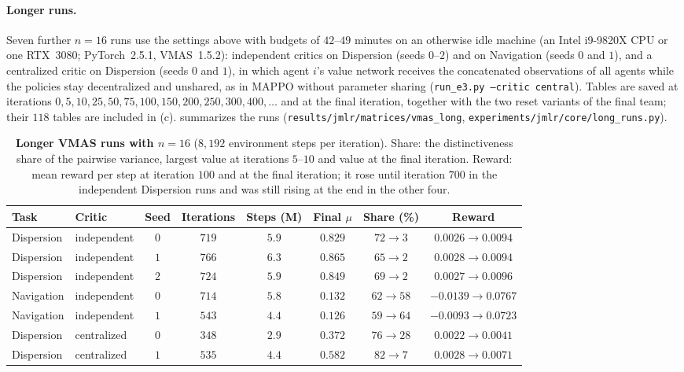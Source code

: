 \paragraph{Longer runs.}
\label{app:exp-details:long}
Seven further $n=16$ runs use the settings above with budgets of $42$--$49$
minutes on an otherwise idle machine (an Intel i9-9820X CPU or one RTX~3080;
PyTorch~2.5.1, VMAS~1.5.2): independent critics on Dispersion (seeds $0$--$2$) and
on Navigation (seeds $0$ and $1$), and a centralized critic on Dispersion (seeds
$0$ and $1$), in which agent $i$'s value network receives the concatenated
observations of all agents while the policies stay decentralized and unshared,
as in MAPPO \citep{yu2022surprising} without parameter sharing
(\texttt{run\_e3.py --critic central}). Tables are saved at iterations
$0,5,10,25,50,75,100,150,200,250,300,400,\dots$ and at the final iteration,
together with the two reset variants of the final team; their $118$ tables are
included in (c).  summarizes the runs
(\texttt{results/jmlr/matrices/vmas\_long}, \texttt{experiments/jmlr/core/long\_runs.py}).

\begin{table}[ht]
\centering
\small
\caption{\textbf{Longer VMAS runs with $n=16$} ($8{,}192$ environment steps per iteration).
Share: the distinctiveness share of the pairwise variance, largest value at
iterations $5$--$10$ and value at the final iteration. Reward: mean reward per
step at iteration $100$ and at the final iteration; it rose until iteration
$700$ in the independent Dispersion runs and was still rising at the end in the
other four.}
\label{tab:long-runs}
\setlength{\tabcolsep}{4.5pt}
\begin{tabular}{@{}llcccccc@{}}
\toprule
Task & Critic & Seed & Iterations & Steps (M) & Final $\mu$ & Share (\%) & Reward \\
\midrule
Dispersion & independent & $0$ & $719$ & $5.9$ & $0.829$ & $72\to3$ & $0.0026\to0.0094$ \\
Dispersion & independent & $1$ & $766$ & $6.3$ & $0.865$ & $65\to2$ & $0.0028\to0.0094$ \\
Dispersion & independent & $2$ & $724$ & $5.9$ & $0.849$ & $69\to2$ & $0.0027\to0.0096$ \\
Navigation & independent & $0$ & $714$ & $5.8$ & $0.132$ & $62\to58$ & $-0.0139\to0.0767$ \\
Navigation & independent & $1$ & $543$ & $4.4$ & $0.126$ & $59\to64$ & $-0.0093\to0.0723$ \\
Dispersion & centralized & $0$ & $348$ & $2.9$ & $0.372$ & $76\to28$ & $0.0022\to0.0041$ \\
Dispersion & centralized & $1$ & $535$ & $4.4$ & $0.582$ & $82\to7$ & $0.0028\to0.0071$ \\
\bottomrule
\end{tabular}
\end{table}

